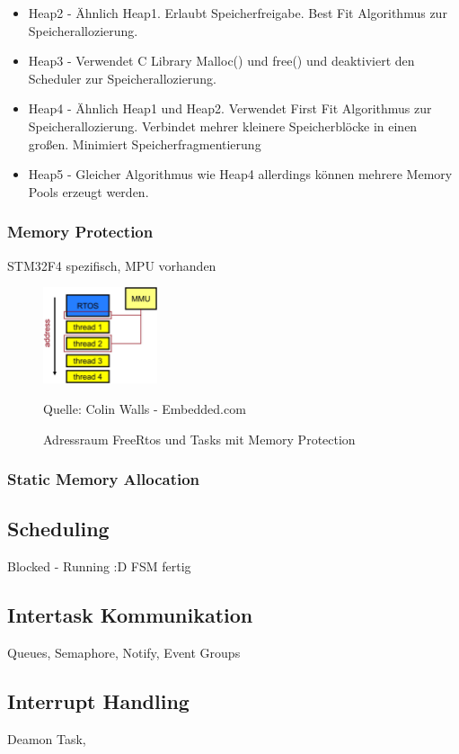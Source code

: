 \documentclass[ngerman]{seminarvorlage}
\newcommand*{\quelle}{%
  \footnotesize Quelle: 
}
\begin{document}
\begin{itemize}
	\item Heap2 - Ähnlich Heap1. Erlaubt Speicherfreigabe. Best Fit Algorithmus zur Speicherallozierung.
	\item Heap3 - Verwendet C Library Malloc() und free() und deaktiviert den Scheduler zur Speicherallozierung.
	\item Heap4 - Ähnlich Heap1 und Heap2. Verwendet First Fit Algorithmus zur Speicherallozierung. Verbindet mehrer kleinere Speicherblöcke in einen großen. Minimiert Speicherfragmentierung
	\item Heap5 - Gleicher Algorithmus wie Heap4 allerdings können mehrere Memory Pools erzeugt werden.
\end{itemize}

\subsubsection{Memory Protection}
\label{sec:Memory Protection}
STM32F4 spezifisch, MPU vorhanden
\begin{figure}[hb!]
	\centering
		\includegraphics[width=0.3\textwidth]{Pictures/EmbeddedCom/addressSpaceMMU}
	\caption{Adressraum FreeRtos und Tasks mit Memory Protection}
	\quelle{Colin Walls - Embedded.com}
	\label{fig:AddressSpaceMMU}
\end{figure} 
   
\subsubsection{Static Memory Allocation}
\subsection{Scheduling}
\label{Scheduling}
Blocked - Running :D FSM fertig
\subsection{Intertask Kommunikation}
Queues, Semaphore, Notify, Event Groups
\subsection{Interrupt Handling}
Deamon Task,
\end{document}
